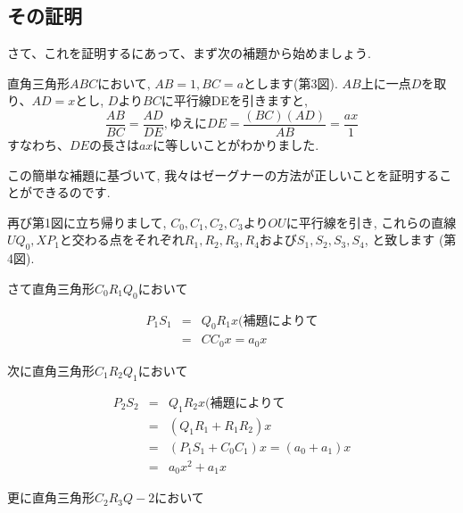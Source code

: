\documentclass[11pt,a4paper]{jsarticle}
\begin{document}
\subsection{その証明}
さて、これを証明するにあって、まず次の補題から始めましょう.

直角三角形$ABC$において, $AB=1, BC=a$とします(第3図). $AB$上に一点$D$を取り、$AD=x$とし, $D$より$BC$に平行線DEを引きますと,
\begin{equation}
\frac{AB}{BC}=\frac{AD}{DE}, ゆえに DE = \frac{(BC)(AD)}{AB}=\frac{ax}{1}
\end{equation}
すなわち、$DE$の長さは$ax$に等しいことがわかりました.

この簡単な補題に基づいて, 我々はゼーグナーの方法が正しいことを証明することができるのです.

再び第1図に立ち帰りまして, $C_0, C_1, C_2, C_3$より$OU$に平行線を引き, これらの直線$UQ_0, XP_1$と交わる点をそれぞれ$R_1, R_2, R_3, R_4$および$S_1,S_2,S_3,S_4$, と致します (第4図).

さて直角三角形$C_0R_1Q_0$において

\begin{eqnarray}
P_1S_1&=&Q_0R_1x(補題によりて\\
&=&CC_0x=a_0x
\end{eqnarray}

次に直角三角形$C_1R_2Q_1$において

\begin{eqnarray}
P_2S_2&=&Q_1R_2x(補題によりて\\
&=&(Q_1R_1+R_1R_2)x\\
&=&(P_1S_1+C_0C_1)x=(a_0+a_1)x\\
&=&a_0x^2+a_1x
\end{eqnarray}

更に直角三角形$C_2R_3Q-2$において


%
%
\end{document}
